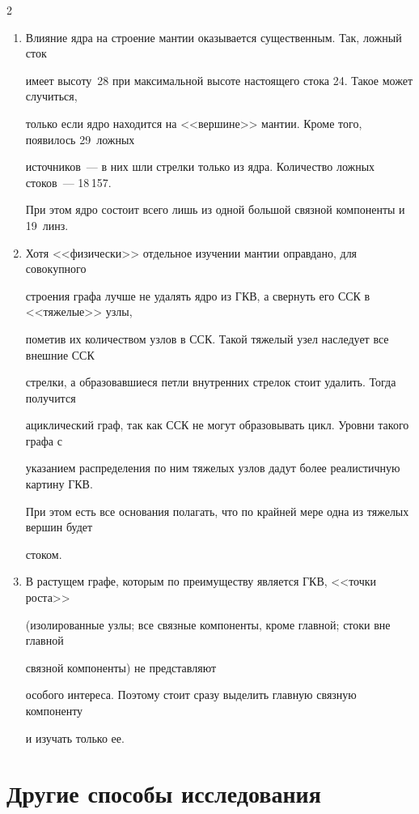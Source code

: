 \begin{multicols}{2}
   \noindent

   \begin{enumerate}[1.]

   \item Влияние ядра на строение мантии оказывается существенным. Так, ложный сток 

имеет высоту~28 при максимальной высоте настоящего стока 24. Такое может случиться, 

только если ядро находится на <<вершине>> мантии. Кроме того, появилось 29~ложных 

источников~--- в них шли стрелки только из ядра. Количество ложных стоков~--- 18\,157. 

При этом ядро состоит всего лишь из одной большой связной компоненты и 19~линз.

   \item Хотя <<физически>> отдельное изучении мантии оправдано, для совокупного 

строения графа лучше не удалять ядро из ГКВ, а свернуть его ССК в <<тяжелые>> узлы, 

пометив их количеством узлов в ССК. Такой тяжелый узел наследует все внешние ССК 

стрелки, а образовавшиеся петли внутренних стрелок стоит удалить. Тогда получится 

ациклический граф, так как ССК не могут образовывать цикл. Уровни такого графа с 

указанием распределения по ним тяжелых узлов дадут более реалистичную картину ГКВ. 

При этом есть все основания полагать, что по крайней мере одна из тяжелых вершин будет 

стоком.

   \item В растущем графе, которым по преимуществу является ГКВ, <<точки роста>> 

(изолированные узлы; все связные компоненты, кроме главной; стоки вне главной 

связной компоненты) не представляют 

особого интереса. Поэтому стоит сразу выделить главную связную компоненту 

и изучать только ее.

\end{enumerate}



\section{Другие способы исследования}




\end{multicols}

